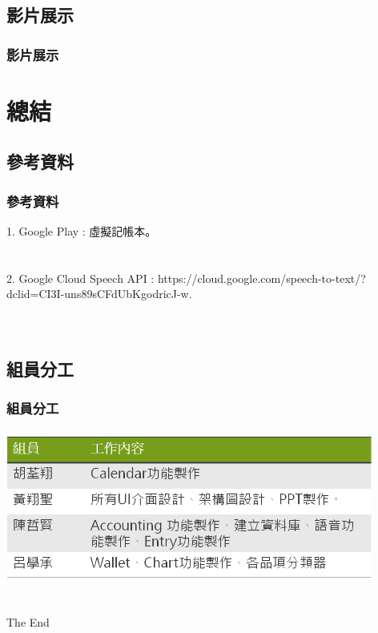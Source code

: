 \documentclass{beamer}
\begin{document}


\subsection{影片展示} %
\begin{frame}
\frametitle{影片展示}


\end{frame}

\section{總結}


\subsection{參考資料} %

\begin{frame}
\frametitle{參考資料}
1. Google Play : 虛擬記帳本。\\~\\~\\

2. Google Cloud Speech API : 
https://cloud.google.com/speech-to-text/?dclid=CI3I-uns89sCFdUbKgodricJ-w.\\~\\~\\


\end{frame}

\subsection{組員分工} %

\begin{frame}
\frametitle{組員分工}
\includegraphics[width=4.75in,height=2in]{3.png}\\~\\
\end{frame}




\begin{frame}
\Huge{\centerline{The End}}
\end{frame}

\end{document}
